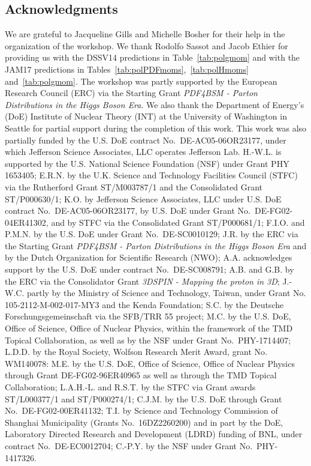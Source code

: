 \subsection*{Acknowledgments}

We are grateful to Jacqueline Gills and Michelle Bosher for their help in the
organization of the workshop.
%
We thank Rodolfo Sassot and Jacob Ethier for providing us with the 
DSSV14 predictions in Table~\ref{tab:polgmom} and with the JAM17 predictions in
Tables~\ref{tab:polPDFmoms},~\ref{tab:polHmoms} and~\ref{tab:polgmom}.
%
The workshop was partly supported by the European Research Council (ERC) via 
the Starting Grant {\it PDF4BSM - Parton Distributions in the Higgs Boson Era}.
%
We also thank the Department of Energy's (DoE) Institute of Nuclear Theory 
(INT) at the University of Washington in Seattle for partial support during 
the completion of this work.
%
This work was also partially funded by the U.S. DoE contract 
No.~DE-AC05-06OR23177, under which Jefferson Science Associates, 
LLC operates Jefferson Lab. 
% 
H.-W.L. is supported by the U.S. National Science Foundation (NSF) under Grant 
PHY 1653405; E.R.N. by the U.K. Science and Technology Facilities Council 
(STFC) via the Rutherford Grant ST/M003787/1 and the Consolidated Grant 
ST/P000630/1; K.O. by Jefferson Science Associates, LLC under U.S. 
DoE contract No.~DE-AC05-06OR23177, 
by U.S. DoE under Grant No.~DE-FG02-04ER41302, 
and by STFC via the Consolidated Grant ST/P000681/1; 
F.I.O. and P.M.N. by the U.S. 
DoE under Grant No.~DE-SC0010129; J.R. by the ERC via the Starting 
Grant {\it PDF4BSM - Parton Distributions in the Higgs Boson Era} and by the 
Dutch Organization for Scientific Research (NWO);
%
A.A. acknowledges support by the U.S. DoE under contract No.~DE-SC008791;
A.B. and G.B. by the ERC via the Consolidator Grant {\it 3DSPIN - Mapping the
proton in 3D};
J.-W.C. partly by the Ministry of Science and Technology, Taiwan,
under Grant No. 105-2112-M-002-017-MY3 and the Kenda Foundation;
S.C. by the Deutsche Forschungsgemeinschaft via the SFB/TRR 55 project;
M.C. by the U.S. DoE, Office of Science, Office of Nuclear Physics, within the 
framework of the TMD Topical Collaboration, as well as by the NSF under Grant 
No.~PHY-1714407;
L.D.D. by the Royal Society, Wolfson Research Merit Award,
grant No. WM140078:
M.E. by the U.S. DoE, Office of Science, Office of Nuclear Physics through 
Grant DE-FG02-96ER40965 as well as through the TMD Topical Collaboration;
L.A.H.-L. and R.S.T. by the STFC via Grant awards ST/L000377/1 and ST/P000274/1;
C.J.M. by the U.S. DoE through Grant No.~DE-FG02-00ER41132;
T.I. by Science and Technology Commission of Shanghai Municipality 
(Grants No.~16DZ2260200) and in part by the DoE, Laboratory Directed Research 
and Development (LDRD) funding of BNL, under contract No.~DE-EC0012704;
C.-P.Y. by the NSF under Grant No.~PHY-1417326.




